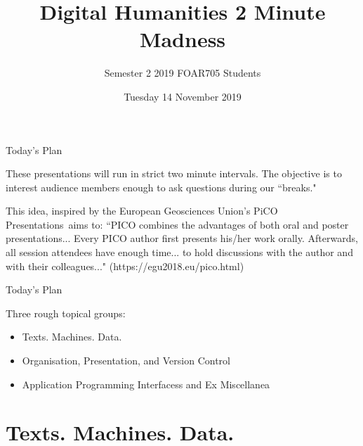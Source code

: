 \documentclass[aspectratio=169, 11pt]{beamer} %
\title{Digital Humanities 2 Minute Madness} %
\author{Semester 2 2019 FOAR705 Students}               %
\institute{Faculty of Arts}         %
\date{Tuesday 14 November 2019}                 %
\begin{document}

\maketitle


\begin{frame}{Today's Plan}

These presentations will run in strict two minute intervals. The objective is to interest audience members enough to ask questions during our ``breaks." 

This idea, inspired by the European Geosciences Union's PiCO Presentations\texttrademark~aims to: ``PICO combines the advantages of both oral and poster presentations... Every PICO author first presents his/her work orally. Afterwards, all session attendees have enough time... to hold discussions with the author and with their colleagues..." (https://egu2018.eu/pico.html)

\end{frame}
\begin{frame}{Today's Plan}

Three rough topical groups: 

\begin{itemize}[label=\textbullet]
    \item Texts. Machines. Data.
    \item Organisation, Presentation, and Version Control
    \item Application Programming Interfacess and Ex Miscellanea
\end{itemize}
\end{frame}



\section{Texts. Machines. Data.}

\end{document}
